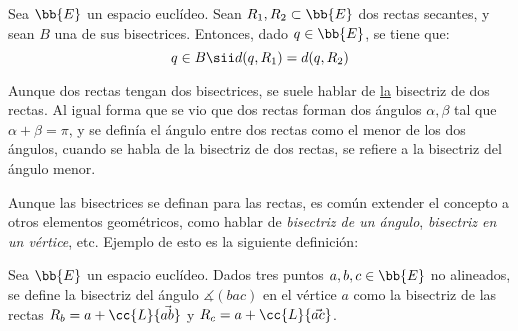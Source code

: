 \begin{prop}
    Sea $\bb{E}$ un espacio euclídeo. Sean $R_1,R_2\subset \bb{E}$ dos rectas secantes, y sean $B$ una de sus bisectrices. Entonces, dado $q\in \bb{E}$, se tiene que:
    \begin{equation*}
        q\in B \sii d(q,R_1)=d(q,R_2)
    \end{equation*}
\end{prop}

\begin{observacion}
    Aunque dos rectas tengan dos bisectrices, se suele hablar de \ul{la} bisectriz de dos rectas. Al igual forma que se vio que dos rectas forman
    dos ángulos $\alpha,\beta$ tal que $\alpha+\beta=\pi$, y se definía el ángulo entre dos rectas como el menor de los dos ángulos, cuando se
    habla de la bisectriz de dos rectas, se refiere a la bisectriz del ángulo menor.\\
\end{observacion}

Aunque las bisectrices se definan para las rectas, es común extender el concepto a otros elementos geométricos, como hablar de \emph{bisectriz de un ángulo},
\emph{bisectriz en un vértice}, etc. Ejemplo de esto es la siguiente definición:
\begin{definicion}
    Sea $\bb{E}$ un espacio euclídeo. Dados tres puntos $a,b,c\in \bb{E}$ no alineados, se define la bisectriz del ángulo $\measuredangle(bac)$
    en el vértice $a$ como la bisectriz de las rectas $R_b=a+\cc{L}\{\vec{ab}\}$ y $R_c=a+\cc{L}\{\vec{ac}\}$.
\end{definicion}


